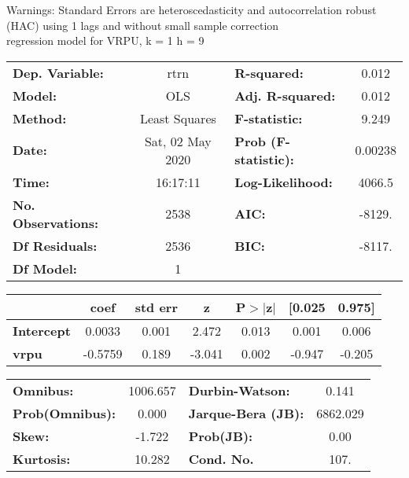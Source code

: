 Warnings: \newline
 [1] Standard Errors are heteroscedasticity and autocorrelation robust (HAC) using 1 lags and without small sample correction\\ 

regression model for VRPU, k = 1 h = 9\begin{center}
\begin{tabular}{lclc}
\toprule
\textbf{Dep. Variable:}    &       rtrn       & \textbf{  R-squared:         } &     0.012   \\
\textbf{Model:}            &       OLS        & \textbf{  Adj. R-squared:    } &     0.012   \\
\textbf{Method:}           &  Least Squares   & \textbf{  F-statistic:       } &     9.249   \\
\textbf{Date:}             & Sat, 02 May 2020 & \textbf{  Prob (F-statistic):} &  0.00238    \\
\textbf{Time:}             &     16:17:11     & \textbf{  Log-Likelihood:    } &    4066.5   \\
\textbf{No. Observations:} &        2538      & \textbf{  AIC:               } &    -8129.   \\
\textbf{Df Residuals:}     &        2536      & \textbf{  BIC:               } &    -8117.   \\
\textbf{Df Model:}         &           1      & \textbf{                     } &             \\
\bottomrule
\end{tabular}
\begin{tabular}{lcccccc}
                   & \textbf{coef} & \textbf{std err} & \textbf{z} & \textbf{P$> |$z$|$} & \textbf{[0.025} & \textbf{0.975]}  \\
\midrule
\textbf{Intercept} &       0.0033  &        0.001     &     2.472  &         0.013        &        0.001    &        0.006     \\
\textbf{vrpu}      &      -0.5759  &        0.189     &    -3.041  &         0.002        &       -0.947    &       -0.205     \\
\bottomrule
\end{tabular}
\begin{tabular}{lclc}
\textbf{Omnibus:}       & 1006.657 & \textbf{  Durbin-Watson:     } &    0.141  \\
\textbf{Prob(Omnibus):} &   0.000  & \textbf{  Jarque-Bera (JB):  } & 6862.029  \\
\textbf{Skew:}          &  -1.722  & \textbf{  Prob(JB):          } &     0.00  \\
\textbf{Kurtosis:}      &  10.282  & \textbf{  Cond. No.          } &     107.  \\
\bottomrule
\end{tabular}
\end{center}

